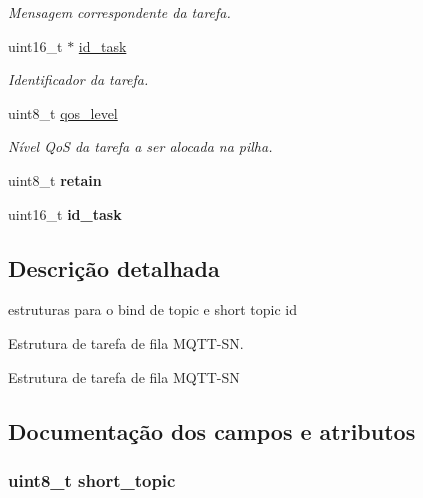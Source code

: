 \begin{DoxyCompactItemize}
\begin{DoxyCompactList}\small\item\em Mensagem correspondente da tarefa. \end{DoxyCompactList}\item 
\hypertarget{structmqtt__sn__task__t_a1dba79ab8685a56d3ae57d84aca21ce8}{uint16\+\_\+t $\ast$ \hyperlink{structmqtt__sn__task__t_a1dba79ab8685a56d3ae57d84aca21ce8}{id\+\_\+task}}\label{structmqtt__sn__task__t_a1dba79ab8685a56d3ae57d84aca21ce8}

\begin{DoxyCompactList}\small\item\em Identificador da tarefa. \end{DoxyCompactList}\item 
\hypertarget{structmqtt__sn__task__t_a9d819901d7d0f5139ca4d3100af5ef11}{uint8\+\_\+t \hyperlink{structmqtt__sn__task__t_a9d819901d7d0f5139ca4d3100af5ef11}{qos\+\_\+level}}\label{structmqtt__sn__task__t_a9d819901d7d0f5139ca4d3100af5ef11}

\begin{DoxyCompactList}\small\item\em Nível Qo\+S da tarefa a ser alocada na pilha. \end{DoxyCompactList}\item 
\hypertarget{structmqtt__sn__task__t_ae25d47ab22bd975ad97012eddb6bbfce}{uint8\+\_\+t {\bfseries retain}}\label{structmqtt__sn__task__t_ae25d47ab22bd975ad97012eddb6bbfce}

\item 
\hypertarget{structmqtt__sn__task__t_a3956eca6f70bddf76d03e10432ef26a1}{uint16\+\_\+t {\bfseries id\+\_\+task}}\label{structmqtt__sn__task__t_a3956eca6f70bddf76d03e10432ef26a1}

\end{DoxyCompactItemize}


\subsection{Descrição detalhada}
estruturas para o bind de topic e short topic id 

Estrutura de tarefa de fila M\+Q\+T\+T-\/\+S\+N.

Estrutura de tarefa de fila M\+Q\+T\+T-\/\+S\+N 

\subsection{Documentação dos campos e atributos}
\hypertarget{structmqtt__sn__task__t_a3d9e943523a4987c87d38c91a8284f6a}{
\subsubsection[{short\+\_\+topic}]{\setlength{\rightskip}{0pt plus 5cm}uint8\+\_\+t short\+\_\+topic}}\label{structmqtt__sn__task__t_a3d9e943523a4987c87d38c91a8284f6a}


